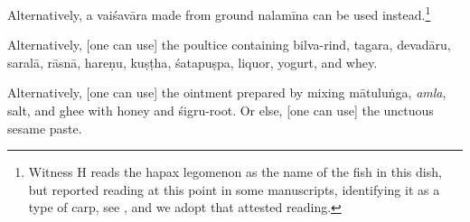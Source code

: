 \begin{translation}
Alternatively, a \gls{vaiśavāra} made from ground
\gls{nalamīna} %
%
can be used instead.\footnote{Witness H reads the hapax legomenon
 as the name of the fish in
this dish, but 
reported reading  at this
point in some manuscripts, identifying it as a
type of carp, see , and we
adopt that attested reading.}




Alternatively, [one can use] the poultice
containing
\gls{bilva}-rind,
\gls{tagara},
\gls{devadāru},
\gls{saralā},
\gls{rāsnā},
\gls{hareṇu},
\gls{kuṣṭha},
\gls{śatapuṣpa},
liquor, yogurt, and whey.

Alternatively,  [one can use] the ointment prepared by mixing
\gls{mātuluṅga}, \emph{amla}, %
salt, and ghee with honey and \gls{śigru}-root. Or else, [one can use]
the unctuous sesame paste. 



\end{translation}
